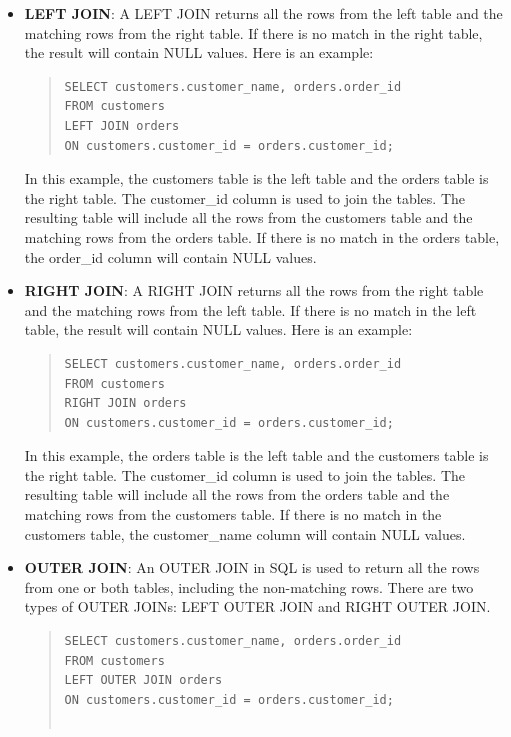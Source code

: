 \documentclass[11pt]{article}
\begin{document}
\begin{itemize}
\item \textbf{LEFT JOIN}: A LEFT JOIN returns all the rows from the left table and the matching rows from the right table. If there is no match in the right table, the result will contain NULL values. Here is an example:
\begin{quote}
\begin{verbatim}
SELECT customers.customer_name, orders.order_id
FROM customers
LEFT JOIN orders
ON customers.customer_id = orders.customer_id;
\end{verbatim}
\end{quote}
In this example, the customers table is the left table and the orders table is the right table. The customer\_id column is used to join the tables. The resulting table will include all the rows from the customers table and the matching rows from the orders table. If there is no match in the orders table, the order\_id column will contain NULL values.



\item \textbf{RIGHT JOIN}: A RIGHT JOIN returns all the rows from the right table and the matching rows from the left table. If there is no match in the left table, the result will contain NULL values. Here is an example:
\begin{quote}
\begin{verbatim}
SELECT customers.customer_name, orders.order_id
FROM customers
RIGHT JOIN orders
ON customers.customer_id = orders.customer_id;
\end{verbatim}
\end{quote}
In this example, the orders table is the left table and the customers table is the right table. The customer\_id column is used to join the tables. The resulting table will include all the rows from the orders table and the matching rows from the customers table. If there is no match in the customers table, the customer\_name column will contain NULL values.



\item \textbf{OUTER JOIN}: An OUTER JOIN in SQL is used to return all the rows from one or both tables, including the non-matching rows. There are two types of OUTER JOINs: LEFT OUTER JOIN and RIGHT OUTER JOIN.
\begin{quote}
\begin{verbatim}
SELECT customers.customer_name, orders.order_id
FROM customers
LEFT OUTER JOIN orders
ON customers.customer_id = orders.customer_id;


\end{verbatim}
\end{quote}
\end{itemize}
\end{document}
